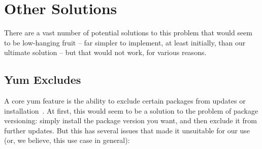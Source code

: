 \section{Other Solutions}
\label{sec:other-solutions}

There are a vast number of potential solutions to this problem that
would seem to be low-hanging fruit -- far simpler to implement, at
least initially, than our ultimate solution -- but that would not
work, for various reasons.

\subsection{Yum Excludes}

A core yum feature is the ability to exclude certain packages from
updates or installation~\cite{Vid02}.  At first, this would seem to
be a solution to the problem of package versioning: simply install the
package version you want, and then exclude it from further updates.
But this has several issues that made it unsuitable for our use (or,
we believe, this use case in general):

